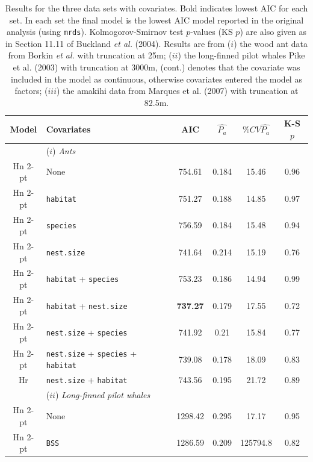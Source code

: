 \documentclass[useAMS,referee, usegraphicx]{biom}
\begin{document}
\begin{table}
\caption{Results for the three data sets with covariates. Bold indicates lowest AIC for each set. In each set the final model is the lowest AIC model reported in the original analysis (using \texttt{mrds}). Kolmogorov-Smirnov test $p$-values (KS $p$) are also given as in Section 11.11 of Buckland \textit{et al.} (2004). Results are from ($i$) the wood ant data from Borkin \textit{et al.} with truncation at 25m; ($ii$) the long-finned pilot whales Pike et al. (2003) with truncation at 3000m, (cont.) denotes that the covariate was included in the model as continuous, otherwise covariates entered the model as factors; ($iii$) the amakihi data from Marques et al. (2007) with truncation at 82.5m.}
\centering
\begin{tabular}{c l c c c c}
\hline \hline
Model & Covariates & AIC & $\hat{P_a}$ & $\% CV \hat{P_a}$ & K-S $p$\\
\hline
 & ($i$) \textit{Ants} & & & & \\
Hn 2-pt  &  None  &  754.61  &  0.184  &  15.46  &  0.96 \\
Hn 2-pt  &   \texttt{habitat} &  751.27  &  0.188  &  14.85  &  0.97 \\
Hn 2-pt  &   \texttt{species} &  756.59  &  0.184  &  15.48  &  0.94 \\
Hn 2-pt  &  \texttt{nest.size} &  741.64  &  0.214  &  15.19  &  0.76 \\
Hn 2-pt  &  \texttt{habitat} + \texttt{species} &  753.23  &  0.186  &  14.94  &  0.99 \\
Hn 2-pt  &  \texttt{habitat} + \texttt{nest.size}  &  \textbf{737.27}  &  0.179  &  17.55  &  0.72 \\
Hn 2-pt  & \texttt{nest.size} + \texttt{species}   &  741.92  &  0.21  &  15.84  &  0.77 \\
Hn 2-pt  &  \texttt{nest.size} + \texttt{species} + \texttt{habitat}  &  739.08  &  0.178  &  18.09  &  0.83 \\
Hr & \texttt{nest.size} + \texttt{habitat} & 743.56 & 0.195  & 21.72 & 0.89\\ %
 & ($ii$) \textit{Long-finned pilot whales} & & & & \\
Hn 2-pt  &  None  &  1298.42  &  0.295  &  17.17  &  0.95 \\
Hn 2-pt  &  \texttt{BSS}  &  1286.59  &  0.209  &  125794.8  &  0.82 \\

\end{tabular}
\end{table}
\end{document}
